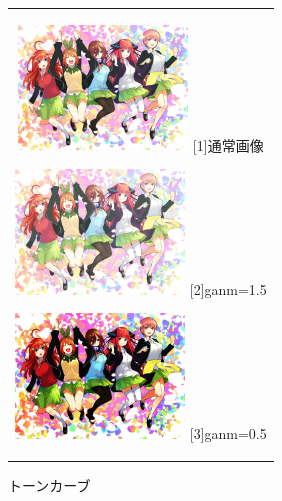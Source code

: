 \documentclass[a4paper,11pt,titlepage]{bxjsarticle}
\begin{document}
\begin{figure}[htbp]
  \begin{center}
    \begin{tabular}{c}

      \begin{minipage}{0.33\hsize}
        \begin{center}
          \includegraphics[clip, width=4.5cm]{./sample.jpg}
          \hspace{1.6cm} [1]通常画像
        \end{center}
      \end{minipage}

      \begin{minipage}{0.33\hsize}
        \begin{center}
          \includegraphics[clip, width=4.5cm]{./img_dst1.jpg}
          \hspace{1.6cm} [2]ganm=1.5
        \end{center}
      \end{minipage}

      \begin{minipage}{0.33\hsize}
        \begin{center}
          \includegraphics[clip, width=4.5cm]{./img_dst2.jpg}
          \hspace{1.6cm} [3]ganm=0.5
        \end{center}
      \end{minipage}

    \end{tabular}
    \caption{トーンカーブ}
    \label{fig:lena}
  \end{center}
\end{figure}
\end{document}
